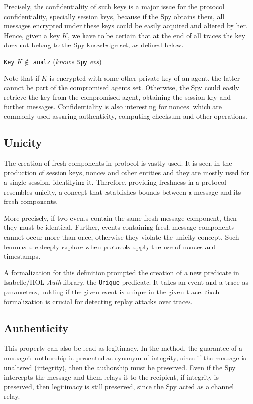 Precisely, the confidentiality of such keys is a major issue for the protocol confidentiality, specially session keys, because if the Spy obtains them, all messages encrypted under these keys could be easily acquired and altered by her. Hence, given a key $K$, we have to be certain that at the end of all traces the key does not belong to the Spy knowledge set, as defined below.

\begin{center}
  \texttt{Key} $K \notin$ \texttt{analz} ($knows$ \texttt{Spy} \textit{evs})
\end{center}

Note that if $K$ is encrypted with some other private key of an agent, the latter cannot be part of the compromised agents set. Otherwise, the Spy could easily retrieve the key from the compromised agent, obtaining the session key and further messages. Confidentiality is also interesting for nonces, which are commonly used assuring authenticity, computing checksum and other operations.



\subsection{Unicity}
The creation of fresh components in protocol is vastly used. It is seen in the production of session keys, nonces and other entities and they are mostly used for a single session, identifying it. Therefore, providing freshness in a protocol resembles unicity, a concept that establishes bounds between a message and its fresh components.

More precisely, if two events contain the same fresh message component, then they must be identical. Further, events containing fresh message components cannot occur more than once, otherwise they violate the unicity concept. Such lemmas are deeply explore when protocols apply the use of nonces and timestamps.

A formalization for this definition prompted the creation of a new predicate in Isabelle/HOL \textit{Auth} library, the \texttt{Unique} predicate. It takes an event and a trace as parameters, holding if the given event is unique in the given trace. Such formalization is crucial for detecting replay attacks over traces.



\subsection{Authenticity}
This property can also be read as legitimacy. In the method, the guarantee of a message's authorship is presented as synonym of integrity, since if the message is unaltered (integrity), then the authorship must be preserved. Even if the Spy intercepts the message and them relays it to the recipient, if integrity is preserved, then legitimacy is still preserved, since the Spy acted as a channel relay.

